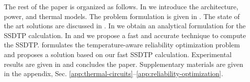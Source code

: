 The rest of the paper is organized as follows. In  we introduce the architecture, power, and thermal models. The problem formulation is given in . The state of the art solutions are discussed in . In  we obtain an analytical formulation for the SSDTP calculation. In  and  we propose a fast and accurate technique to compute the SSDTP.  formulates the temperature-aware reliability optimization problem and proposes a solution based on our fast SSDTP calculation. Experimental results are given in  and  concludes the paper. Supplementary materials are given in the appendix, Sec. \ref{app:thermal-circuits}--\ref{app:reliability-optimization}.
